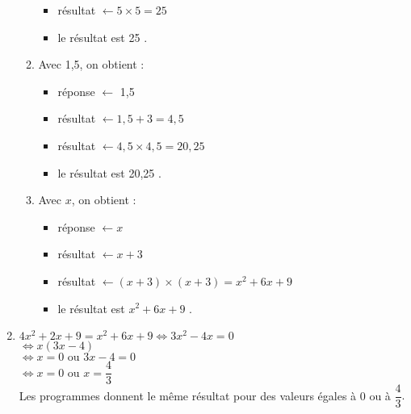 \begin{enumerate}
\begin{multicols}{3}
\begin{enumerate}
\begin{itemize}
                     \item résultat $\leftarrow5\times5 =25$
                     \item {\blue \og le résultat est 25 \fg}.
                  \end{itemize}
                  \columnbreak
               \item Avec 1,5, on obtient : \\
                  \begin{itemize}
                     \item réponse $\leftarrow$ 1,5
                     \item résultat $\leftarrow1,5+3 =4,5$
                     \item résultat $\leftarrow4,5\times4,5 =20,25$
                     \item {\blue \og le résultat est 20,25 \fg}.
                  \end{itemize}
                  \columnbreak
               \item Avec $x$, on obtient : \\
                  \begin{itemize}
                     \item réponse $\leftarrow x$
                     \item résultat $\leftarrow x+3$
                     \item résultat $\leftarrow(x+3)\times(x+3) =x^2+6x+9$
                     \item {\blue \og le résultat est $x^2+6x+9$ \fg}.
                  \end{itemize}
                  \columnbreak
            \end{enumerate}
         \end{multicols}
      \setcounter{enumi}{2}
      \item $4x^2+2x+9 =x^2+6x+9 \iff 3x^2-4x =0$ \\
         \hspace*{4.3cm} $\iff x(3x-4)$ \\
         \hspace*{4.3cm} $\iff x =0 \text{ ou } 3x-4 =0$ \\ [1mm]
         \hspace*{4.3cm} $\iff x =0 \text{ ou } x=\dfrac43$ \\
         {\blue Les programmes donnent le même résultat pour des valeurs égales à 0 ou à $\dfrac43$}.
   \end{enumerate}
